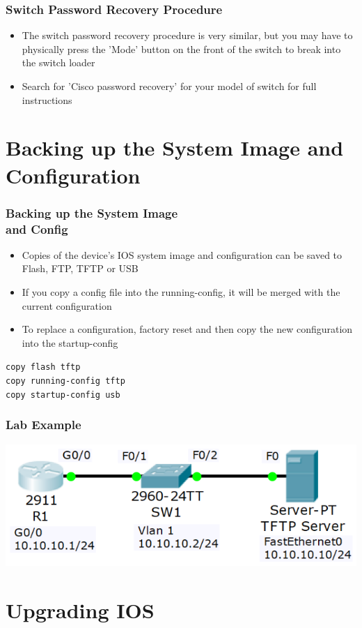 \documentclass[pdflatex,compress,mathserif]{beamer}
\begin{document}
\begin{frame}
	\frametitle{Switch Password Recovery Procedure}
	\begin{itemize}
		\item The switch password recovery procedure is very similar, but you may have to physically press the 'Mode' button on the front of the switch to break into the switch loader
		\item Search for 'Cisco password recovery' for your model of switch for full instructions
	\end{itemize}
\end{frame}

\section{Backing up the System Image and Configuration}

\begin{frame}
	\frametitle{Backing up the System Image\\and Config}
	\begin{itemize}
		\item Copies of the device’s IOS system image and configuration can be saved to Flash, FTP, TFTP or USB
		\item If you copy a config file into the running-config, it will be merged with the current configuration
		\item To replace a configuration, factory reset and then copy the new configuration into the startup-config
	\end{itemize}
	\texttt{copy flash tftp\\
		copy running-config tftp\\
		copy startup-config usb}
\end{frame}

\begin{frame}
	\frametitle{Lab Example}
	\begin{center}
		\includegraphics[width=0.7\linewidth]{img/img02}
	\end{center}
\end{frame}

\section{Upgrading IOS}
\end{document}
